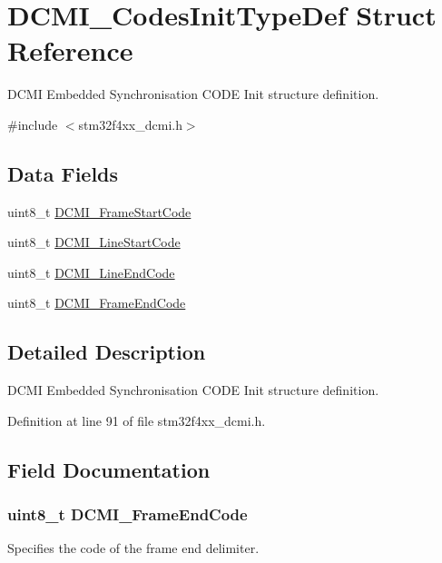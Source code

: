\hypertarget{struct_d_c_m_i___codes_init_type_def}{\section{D\-C\-M\-I\-\_\-\-Codes\-Init\-Type\-Def Struct Reference}
\label{struct_d_c_m_i___codes_init_type_def}
}


D\-C\-M\-I Embedded Synchronisation C\-O\-D\-E Init structure definition.  




{\ttfamily \#include $<$stm32f4xx\-\_\-dcmi.\-h$>$}

\subsection*{Data Fields}
\begin{DoxyCompactItemize}
\item 
uint8\-\_\-t \hyperlink{struct_d_c_m_i___codes_init_type_def_ac5bcf00f4b3d6f215080217580522f5d}{D\-C\-M\-I\-\_\-\-Frame\-Start\-Code}
\item 
uint8\-\_\-t \hyperlink{struct_d_c_m_i___codes_init_type_def_a636319f3f2ba2aa248964d277286feb2}{D\-C\-M\-I\-\_\-\-Line\-Start\-Code}
\item 
uint8\-\_\-t \hyperlink{struct_d_c_m_i___codes_init_type_def_a0660f09f5c9761069bb0eb130463023b}{D\-C\-M\-I\-\_\-\-Line\-End\-Code}
\item 
uint8\-\_\-t \hyperlink{struct_d_c_m_i___codes_init_type_def_a614a64246d94bc59bd8ba3d73151bfa6}{D\-C\-M\-I\-\_\-\-Frame\-End\-Code}
\end{DoxyCompactItemize}


\subsection{Detailed Description}
D\-C\-M\-I Embedded Synchronisation C\-O\-D\-E Init structure definition. 

Definition at line 91 of file stm32f4xx\-\_\-dcmi.\-h.



\subsection{Field Documentation}
\hypertarget{struct_d_c_m_i___codes_init_type_def_a614a64246d94bc59bd8ba3d73151bfa6}{
\subsubsection[{D\-C\-M\-I\-\_\-\-Frame\-End\-Code}]{\setlength{\rightskip}{0pt plus 5cm}uint8\-\_\-t D\-C\-M\-I\-\_\-\-Frame\-End\-Code}}\label{struct_d_c_m_i___codes_init_type_def_a614a64246d94bc59bd8ba3d73151bfa6}
Specifies the code of the frame end delimiter. 

